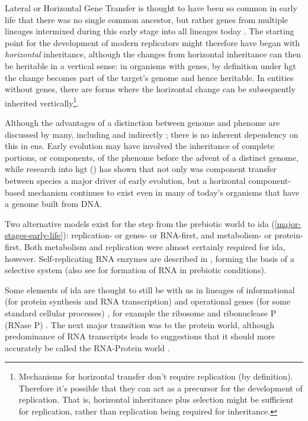 Lateral or Horizontal Gene Transfer is thought to have been so common in early life that there was no single common ancestor, but rather genes from multiple lineages intermixed during this early stage into all lineages today \parencite{Ragan2009}. The starting point for the development of modern replicators might therefore have began with \emph{horizontal} inheritance, although the changes from horizontal inheritance can then be heritable in a vertical sense: in organisms with genes, by definition under \gls{hgt} the change becomes part of the target’s genome and hence heritable. In entities without genes, there are forms where the horizontal change can be subsequently inherited vertically\footnote{Mechanisms for horizontal transfer don’t require replication (by definition). Therefore it’s possible that they can act as a precursor for the development of replication. That is, horizontal inheritance plus selection might be sufficient for replication, rather than replication being required for inheritance.}. 

Although the advantages of a distinction between genome and phenome are discussed by many, including \parencite[section 7.2.3]{Taylor1999} and indirectly \textcite{VonNeumann1966}; there is no inherent dependency on this in \gls{ens}. Early evolution may have involved the inheritance of complete portions, or components, of the phenome before the advent of a distinct genome, while research into \gls{hgt} (\eg \textcite{Ochman2000,Pace:2008vi,Ragan2009}) has shown that not only was component transfer between species a major driver of early evolution, but a horizontal component-based mechanism continues to exist even in many of today's organisms that have a genome built from DNA. 

Two alternative models exist for the step from the prebiotic world  to \gls{ida} (\cref{major-stages-early-life}): replication- or genes- or RNA-first, and metabolism- or protein-first. Both metabolism and replication were almost certainly required for \gls{ida}, however. Self-replicating RNA enzymes are described in \textcite{Lincoln2009}, forming the basis of a selective system (also see \textcite{Cheng2010,Powner2009} for formation of RNA in prebiotic conditions). 

Some elements of \gls{ida}  are thought to still be with us in lineages of informational (for protein synthesis and RNA transcription) and operational genes (for some standard cellular processes) \parencite{Ragan2009}, for example the ribosome and ribonuclease P (RNase P) \parencite{Wilson2009}. The next major transition was to the protein world, although predominance of RNA transcripts leads to suggestions that it should more accurately be called the RNA-Protein world \parencite{Altman2013}. 

